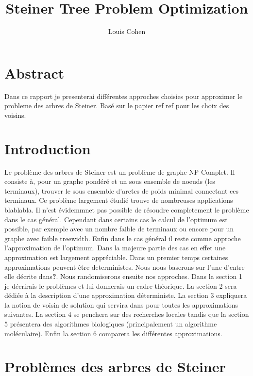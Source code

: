 \documentclass[10pt,a4paper]{article}
\author{Louis Cohen}
\title{Steiner Tree Problem Optimization}
\begin{document}
\maketitle	

\tableofcontents

\section{Abstract}

Dans ce rapport je presenterai différentes approches choisies pour approximer le probleme des arbres de Steiner. Basé sur le papier ref ref pour les choix des voisins. 

\section{Introduction}

Le problème des arbres de Steiner est un problème de graphe NP Complet. Il consiste à, pour un graphe pondéré et un sous ensemble de noeuds (les terminaux), trouver le sous ensemble d'aretes de poids minimal connectant ces terminaux. Ce problème largement étudié trouve de nombreuses applications blablabla. Il n'est évidemmnet pas possible de résoudre completement le problème dans le cas général. Cependant dans certains cas le calcul de l'optimum est possible, par exemple avec un nombre faible de terminaux ou encore pour un graphe avec faible treewidth. Enfin dans le cas général il reste comme approche l'approximation de l'optimum. Dans la majeure partie des cas en effet une approximation est largement appréciable. Dans un premier temps certaines approximations peuvent être deterministes.  Nous nous baserons sur l'une d'entre elle décrite dans\textbf{?}. Nous randomiserons ensuite nos approches. Dans la section 1 je décrirais le problèmes et lui donnerais un cadre théorique. La section 2 sera dédiée à la description d'une approximation déterministe. La section 3 expliquera la notion de voisin de solution qui servira dans pour toutes les approximations suivantes. La section 4 se penchera sur des recherches locales tandis que la section 5 présentera des algorithmes biologiques (principalement un algorithme moléculaire). Enfin la section 6 comparera les différentes approximations.


\section{Problèmes des arbres de Steiner}
\end{document}

